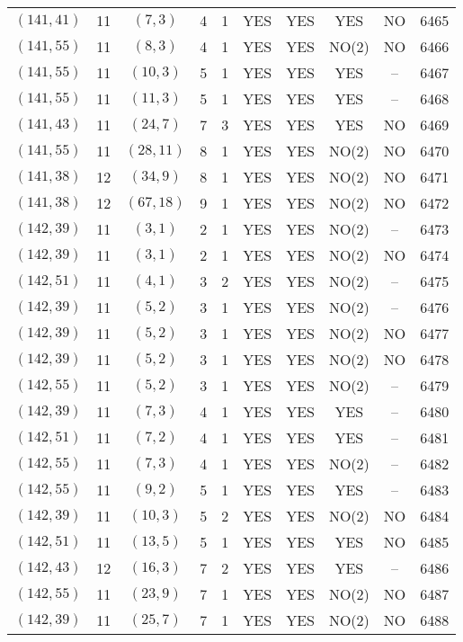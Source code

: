 \begin{longtable}{|c|c|c|c|c|c|c|c|c|c|}
$(141, 41)$ & 11 & $(7, 3)$ & 4 & 1 & YES & YES & YES & NO & 6465\\
$(141, 55)$ & 11 & $(8, 3)$ & 4 & 1 & YES & YES & NO(2) & NO & 6466\\
$(141, 55)$ & 11 & $(10, 3)$ & 5 & 1 & YES & YES & YES & -- & 6467\\
$(141, 55)$ & 11 & $(11, 3)$ & 5 & 1 & YES & YES & YES & -- & 6468\\
$(141, 43)$ & 11 & $(24, 7)$ & 7 & 3 & YES & YES & YES & NO & 6469\\
$(141, 55)$ & 11 & $(28, 11)$ & 8 & 1 & YES & YES & NO(2) & NO & 6470\\
$(141, 38)$ & 12 & $(34, 9)$ & 8 & 1 & YES & YES & NO(2) & NO & 6471\\
$(141, 38)$ & 12 & $(67, 18)$ & 9 & 1 & YES & YES & NO(2) & NO & 6472\\
$(142, 39)$ & 11 & $(3, 1)$ & 2 & 1 & YES & YES & NO(2) & -- & 6473\\
$(142, 39)$ & 11 & $(3, 1)$ & 2 & 1 & YES & YES & NO(2) & NO & 6474\\
$(142, 51)$ & 11 & $(4, 1)$ & 3 & 2 & YES & YES & NO(2) & -- & 6475\\
$(142, 39)$ & 11 & $(5, 2)$ & 3 & 1 & YES & YES & NO(2) & -- & 6476\\
$(142, 39)$ & 11 & $(5, 2)$ & 3 & 1 & YES & YES & NO(2) & NO & 6477\\
$(142, 39)$ & 11 & $(5, 2)$ & 3 & 1 & YES & YES & NO(2) & NO & 6478\\
$(142, 55)$ & 11 & $(5, 2)$ & 3 & 1 & YES & YES & NO(2) & -- & 6479\\
$(142, 39)$ & 11 & $(7, 3)$ & 4 & 1 & YES & YES & YES & -- & 6480\\
$(142, 51)$ & 11 & $(7, 2)$ & 4 & 1 & YES & YES & YES & -- & 6481\\
$(142, 55)$ & 11 & $(7, 3)$ & 4 & 1 & YES & YES & NO(2) & -- & 6482\\
$(142, 55)$ & 11 & $(9, 2)$ & 5 & 1 & YES & YES & YES & -- & 6483\\
$(142, 39)$ & 11 & $(10, 3)$ & 5 & 2 & YES & YES & NO(2) & NO & 6484\\
$(142, 51)$ & 11 & $(13, 5)$ & 5 & 1 & YES & YES & YES & NO & 6485\\
$(142, 43)$ & 12 & $(16, 3)$ & 7 & 2 & YES & YES & YES & -- & 6486\\
$(142, 55)$ & 11 & $(23, 9)$ & 7 & 1 & YES & YES & NO(2) & NO & 6487\\
$(142, 39)$ & 11 & $(25, 7)$ & 7 & 1 & YES & YES & NO(2) & NO & 6488\\

\end{longtable}
